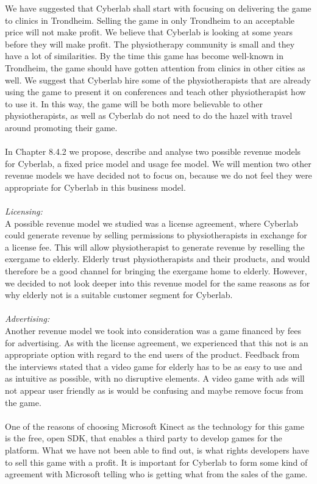We have suggested that Cyberlab shall start with focusing on delivering the game to clinics in Trondheim. Selling the game in only Trondheim to an acceptable price will not make profit. We believe that Cyberlab is looking at some years before they will make profit. The physiotherapy community is small and they have a lot of similarities. By the time this game has become well-known in Trondheim, the game should have gotten attention from clinics in other cities as well. We suggest that Cyberlab hire some of the physiotherapists that are already using the game to present it on conferences and teach other physiotherapist how to use it. In this way, the game will be both more believable to other physiotherapists, as well as Cyberlab do not need to do the hazel with travel around promoting their game. \\ \\
In Chapter 8.4.2 we propose, describe and analyse two possible revenue models for Cyberlab, a fixed price model and usage fee model. We will mention two other revenue models we have decided not to focus on, because we do not feel they were appropriate for Cyberlab in this business model. \\ \\
\emph{Licensing:} \\ A possible revenue model we studied was a license agreement, where Cyberlab could generate revenue by selling permissions to physiotherapists in exchange for a license fee. This will allow physiotherapist to generate revenue by reselling the exergame to elderly. Elderly trust physiotherapists and their products, and would therefore be a good channel for bringing the exergame home to elderly. However, we decided to not look deeper into this revenue model for the same reasons as for why elderly not is a suitable customer segment for Cyberlab.\\ \\
\emph{Advertising:}\\ Another revenue model we took into consideration was a game financed by fees for advertising. As with the license agreement, we experienced that this not is an appropriate option with regard to the end users of the product. Feedback from the interviews stated that a video game for elderly has to be as easy to use and as intuitive as possible, with no disruptive elements. A video game with ads will not appear user friendly as is would be confusing and maybe remove focus from the game.\\ \\
One of the reasons of choosing Microsoft Kinect as the technology for this game is the free, open SDK, that enables a third party to develop games for the platform. What we have not been able to find out, is what rights developers have to sell this game with a profit. It is important for Cyberlab to form some kind of agreement with Microsoft telling who is getting what from the sales of the game. \\ \\

